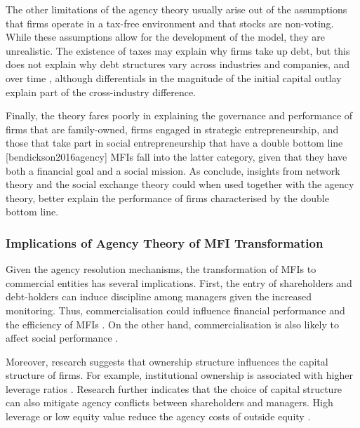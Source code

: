 \documentclass[a4paper, nobind]{templates/ociamthesis}
\begin{document}
The other limitations of the agency theory usually arise out of the assumptions that firms operate in a tax-free environment and that stocks are non-voting. While these assumptions allow for the development of the model, they are unrealistic. The existence of taxes may explain why firms take up debt, but this does not explain why debt structures vary across industries and companies, and over time \autocite{deangelo2015stable}, although differentials in the magnitude of the initial capital outlay explain part of the cross-industry difference.

Finally, the theory fares poorly in explaining the governance and performance of firms that are family-owned, firms engaged in strategic entrepreneurship, and those that take part in social entrepreneurship that have a double bottom line {[}bendickson2016agency{]} MFIs fall into the latter category, given that they have both a financial goal and a social mission. As \textcite{bendickson2016agency} conclude, insights from network theory and the social exchange theory could when used together with the agency theory, better explain the performance of firms characterised by the double bottom line.

\hypertarget{implications-of-agency-theory-of-mfi-transformation}{%
\subsubsection{Implications of Agency Theory of MFI Transformation}\label{implications-of-agency-theory-of-mfi-transformation}}

\noindent Given the agency resolution mechanisms, the transformation of MFIs to commercial entities has several implications. First, the entry of shareholders and debt-holders can induce discipline among managers given the increased monitoring. Thus, commercialisation could influence financial performance and the efficiency of MFIs \autocite{berger2006capital,khachatryan2017performance}. On the other hand, commercialisation is also likely to affect social performance \autocite{d2017ngos}.

Moreover, research suggests that ownership structure influences the capital structure of firms. For example, institutional ownership is associated with higher leverage ratios \autocite{sun2016ownership}. Research further indicates that the choice of capital structure can also mitigate agency conflicts between shareholders and managers. High leverage or low equity value reduce the agency costs of outside equity \autocite{berger2006capital}.
\end{document}
